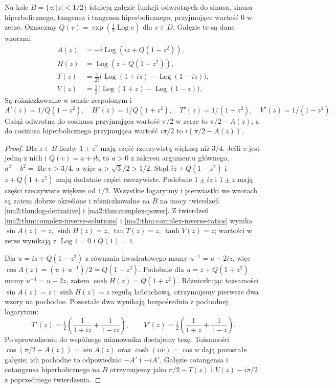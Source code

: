 \begin{twierdzenie}
\label{ma2:thm:local-inverse-branches}
Na kole $B=\{z:|z|<1/2\}$ istnieją gałęzie funkcji
odwrotnych do sinusa, sinusa hiperbolicznego,
tangensa i tangensa hiperbolicznego, przyjmujące
wartość $0$ w zerze. Oznaczmy
$Q(v)=\exp(\tfrac12\operatorname{Log}v)$ dla $v\in D$.
Gałęzie te są dane wzorami
\begin{align*}
 A(z)&=-i\operatorname{Log}(iz+Q(1-z^2)),\\
 H(z)&=\operatorname{Log}(z+Q(1+z^2)),\\
 T(z)&=\tfrac1{2i}\big(\operatorname{Log}(1+iz)
                         -\operatorname{Log}(1-iz)\big),\\
 V(z)&=\tfrac12\big(\operatorname{Log}(1+z)
                         -\operatorname{Log}(1-z)\big).
\end{align*}
Są różniczkowalne w sensie zespolonym i
\[
 A'(z)=1/Q(1-z^2),\quad H'(z)=1/Q(1+z^2),
 \quad T'(z)=1/(1+z^2),\quad V'(z)=1/(1-z^2).
\]
Gałąź odwrotna do cosinusa przyjmująca wartość $\pi/2$
w zerze to $\pi/2-A(z)$, a do cosinusa hiperbolicznego
przyjmująca wartość $i\pi/2$ to $i(\pi/2-A(z))$.
\end{twierdzenie}
\begin{proof}
Dla $z\in B$ liczby $1\pm z^2$ mają część rzeczywistą
większą niż $3/4$. Jeśli $v$ jest jedną z nich i
$Q(v)=a+ib$, to $a>0$ z zakresu argumentu głównego,
$a^2-b^2=\operatorname{Re}v>3/4$, a więc
$a>\sqrt{3}/2>1/2$. Stąd $iz+Q(1-z^2)$ i
$z+Q(1+z^2)$ mają dodatnie części rzeczywiste.
Podobnie $1\pm iz$ i $1\pm z$ mają części rzeczywiste
większe od $1/2$. Wszystkie logarytmy i pierwiastki
we wzorach są zatem dobrze określone i różniczkowalne
na $B$ na mocy twierdzeń \ref{ma2:thm:log-derivative}
i \ref{ma2:thm:complex-power}.
Z twierdzeń \ref{ma2:thm:complex-inverse-solutions}
i \ref{ma2:thm:complex-inverse-ratios} wynika
$\sin A(z)=z$, $\sinh H(z)=z$, $\tan T(z)=z$,
$\tanh V(z)=z$; wartości w zerze wynikają z
$\operatorname{Log}1=0$ i $Q(1)=1$.

Dla $u=iz+Q(1-z^2)$ z równania kwadratowego mamy
$u^{-1}=u-2iz$, więc
$\cos A(z)=(u+u^{-1})/2=Q(1-z^2)$.
Podobnie dla $u=z+Q(1+z^2)$ mamy
$u^{-1}=u-2z$, zatem $\cosh H(z)=Q(1+z^2)$.
Różniczkując tożsamości $\sin A(z)=z$ i
$\sinh H(z)=z$ regułą łańcuchową, otrzymujemy
pierwsze dwa wzory na pochodne. Pozostałe dwa
wynikają bezpośrednio z pochodnej logarytmu:
\[
 T'(z)=\tfrac12\left(\frac1{1+iz}+\frac1{1-iz}\right),
 \qquad
 V'(z)=\tfrac12\left(\frac1{1+z}+\frac1{1-z}\right).
\]
Po sprowadzeniu do wspólnego mianownika dostajemy tezę.
Tożsamości $\cos(\pi/2-A(z))=\sin A(z)$
oraz $\cosh(iw)=\cos w$ dają pozostałe gałęzie;
ich pochodne to odpowiednio $-A'$ i $-iA'$.
Gałęzie cotangensa i cotangensa hiperbolicznego
na $B$ otrzymujemy jako $\pi/2-T(z)$ i
$V(z)-i\pi/2$ z poprzedniego twierdzenia.
\end{proof}

